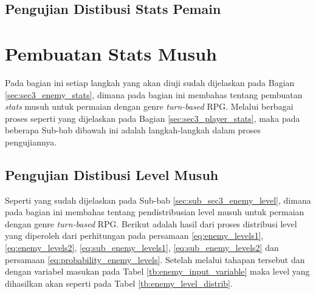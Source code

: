\subsection{Pengujian Distibusi Stats Pemain}
\label{sec:sub_sec4_eval_multi-character_stats}
\vspace{1ex}

\section{Pembuatan Stats Musuh}
\label{sec:sec4_eval_turn-based_enemy}
\vspace{1ex}

Pada bagian ini setiap langkah yang akan diuji sudah dijelaskan pada Bagian \ref{sec:sec3_enemy_stats}, dimana pada bagian ini membahas tentang pembuatan \textit{stats} musuh untuk permaian dengan genre \textit{turn-based} RPG. Melalui berbagai proses seperti yang dijelaskan pada Bagian \ref{sec:sec3_player_stats}, maka pada beberapa Sub-bab dibawah ini adalah langkah-langkah dalam proses pengujiannya.
\vspace{1ex}


\subsection{Pengujian Distibusi Level Musuh}
\label{sec:sub_sec4_eval_dist_enemy_level}
\vspace{1ex}

Seperti yang sudah dijelaskan pada Sub-bab \ref{sec:sub_sec3_enemy_level}, dimana pada bagian ini membahas tentang pendistribusian level musuh untuk permaian dengan genre \textit{turn-based} RPG. Berikut adalah hasil dari proses distribusi level yang diperoleh dari perhitungan pada persamaan \ref{eq:enemy_levels1}, \ref{eq:enemy_levels2}, \ref{eq:sub_enemy_levels1}, \ref{eq:sub_enemy_levels2} dan persamaan \ref{eq:probability_enemy_levels}. Setelah melalui tahapan tersebut dan dengan variabel masukan pada Tabel \ref{tb:enemy_input_variable} maka level yang dihasilkan akan seperti pada Tabel \ref{tb:enemy_level_distrib}.

